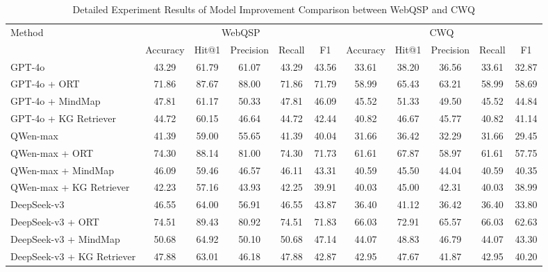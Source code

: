 \begin{table*}[h]
\centering
\scriptsize
\caption{Detailed Experiment Results of Model Improvement Comparison between WebQSP and CWQ}
\label{tabel:detail}
\renewcommand{\arraystretch}{1.5} %
\begin{tabular}{l c c c c c | c c c c c}
\toprule
 \multirow{2}{*}{Method} & \multicolumn{5}{c|}{WebQSP} & \multicolumn{5}{c}{CWQ} \\
\cline{2-11}
 & Accuracy & Hit@1 & Precision & Recall & F1 & Accuracy & Hit@1 & Precision & Recall & F1 \\
\hline
GPT-4o & 43.29 & 61.79 & 61.07 & 43.29 & 43.56 & 33.61 & 38.20 & 36.56 & 33.61 & 32.87 \\
GPT-4o + ORT & 71.86 & 87.67 & 88.00 & 71.86 & 71.79 & 58.99 & 65.43 & 63.21 & 58.99 & 58.69 \\
GPT-4o + MindMap & 47.81 & 61.17 & 50.33 & 47.81 & 46.09 & 45.52 & 51.33 & 49.50 & 45.52 & 44.84 \\
GPT-4o + KG Retriever & 44.72 & 60.15 & 46.64 & 44.72 & 42.44 & 40.82 & 46.67 & 45.77 & 40.82 & 41.14 \\
\hline
QWen-max & 41.39 & 59.00 & 55.65 & 41.39 & 40.04 & 31.66 & 36.42 & 32.29 & 31.66 & 29.45 \\
QWen-max + ORT & 74.30 & 88.14 & 81.00 & 74.30 & 71.73 & 61.61 & 67.87 & 58.97 & 61.61 & 57.75 \\
QWen-max + MindMap & 46.09 & 59.46 & 46.57 & 46.11 & 43.31 & 40.59 & 45.50 & 44.04 & 40.59 & 40.35 \\
QWen-max + KG Retriever & 42.23 & 57.16 & 43.93 & 42.25 & 39.91 & 40.03 & 45.00 & 42.31 & 40.03 & 38.99 \\
\hline
DeepSeek-v3 & 46.55 & 64.00 & 56.91 & 46.55 & 43.87 & 36.40 & 41.12 & 36.42 & 36.40 & 33.80 \\
DeepSeek-v3 + ORT & 74.51 & 89.43 & 80.92 & 74.51 & 71.83 & 66.03 & 72.91 & 65.57 & 66.03 & 62.63 \\
DeepSeek-v3 + MindMap & 50.68 & 64.92 & 50.10 & 50.68 & 47.14 & 44.07 & 48.83 & 46.79 & 44.07 & 43.30 \\
DeepSeek-v3 + KG Retriever & 47.88 & 63.01 & 46.18 & 47.88 & 42.87 & 42.95 & 47.67 & 41.87 & 42.95 & 40.20 \\
\bottomrule
\end{tabular}
\end{table*}